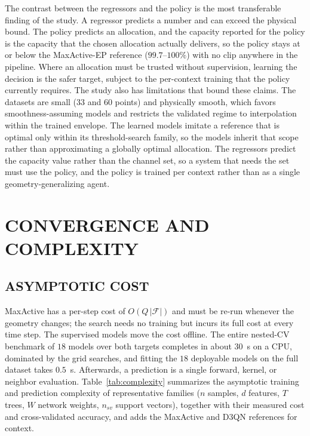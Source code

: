 \documentclass{ieee-ojvt}
\begin{document}
The contrast between the regressors and the policy is the most transferable finding of
the study. A regressor predicts a number and can exceed the physical bound. The policy
predicts an allocation, and the capacity reported for the policy is the capacity that the
chosen allocation actually delivers, so the policy stays at or below the MaxActive-EP
reference ($99.7$--$100\%$) with no clip anywhere in the pipeline. Where an allocation
must be trusted without supervision, learning the decision is the safer target, subject
to the per-context training that the policy currently requires. The study also has
limitations that bound these claims. The datasets are small ($33$ and $60$ points) and
physically smooth, which favors smoothness-assuming models and restricts the validated
regime to interpolation within the trained envelope. The learned models imitate a
reference that is optimal only within its threshold-search family, so the models inherit
that scope rather than approximating a globally optimal allocation. The regressors
predict the capacity value rather than the channel set, so a system that needs the set
must use the policy, and the policy is trained per context rather than as a single
geometry-generalizing agent.


\section{CONVERGENCE AND COMPLEXITY}
\label{sec:complexity}
\subsection{ASYMPTOTIC COST}
MaxActive has a per-step cost of $O(Q\,|\mathcal{F}|)$ and must be re-run whenever the
geometry changes; the search needs no training but incurs its full cost at every time
step. The supervised models move the cost offline. The entire nested-CV benchmark of
$18$ models over both targets completes in about $30$~s on a CPU, dominated by the grid
searches, and fitting the $18$ deployable models on the full dataset takes $0.5$~s.
Afterwards, a prediction is a single forward, kernel, or neighbor evaluation.
Table~\ref{tab:complexity} summarizes the asymptotic training and prediction complexity
of representative families ($n$ samples, $d$ features, $T$ trees, $W$ network weights,
$n_{sv}$ support vectors), together with their measured cost and cross-validated
accuracy, and adds the MaxActive and D3QN references for context.
\end{document}
